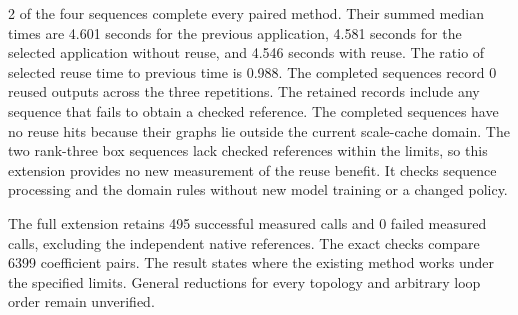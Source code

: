 2 of the four sequences complete every paired method. Their summed median times are 4.601 seconds for the previous application, 4.581 seconds for the selected application without reuse, and 4.546 seconds with reuse. The ratio of selected reuse time to previous time is 0.988. The completed sequences record 0 reused outputs across the three repetitions. The retained records include any sequence that fails to obtain a checked reference. The completed sequences have no reuse hits because their graphs lie outside the current scale-cache domain. The two rank-three box sequences lack checked references within the limits, so this extension provides no new measurement of the reuse benefit. It checks sequence processing and the domain rules without new model training or a changed policy.

The full extension retains 495 successful measured calls and 0 failed measured calls, excluding the independent native references. The exact checks compare 6399 coefficient pairs. The result states where the existing method works under the specified limits. General reductions for every topology and arbitrary loop order remain unverified.
